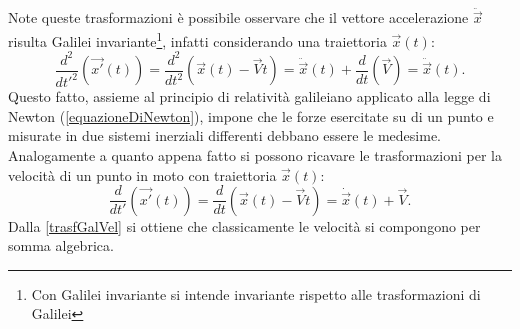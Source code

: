 Note queste trasformazioni è possibile osservare che il vettore accelerazione $\ddot{\vec{x}}$ risulta Galilei invariante\footnote{Con Galilei invariante si intende invariante rispetto alle trasformazioni di Galilei}, infatti considerando una traiettoria $\vec{x}(t)$:
\begin{equation*}
	\frac{d^2}{dt'^2}(\vec{x'}(t))=\frac{d^2}{dt^2}(\vec{x}(t)-\vec{V}t)=\ddot{\vec{x}}(t)+\frac{d}{dt}(\vec{V})=\ddot{\vec{x}}(t).
\end{equation*} 
Questo fatto, assieme al principio di relatività galileiano applicato alla legge di Newton (\ref{equazioneDiNewton}), 
impone che le forze esercitate su di un punto e misurate in due sistemi inerziali differenti debbano essere le medesime. \\
Analogamente a quanto appena fatto si possono ricavare le trasformazioni per la velocità di un punto in moto con traiettoria $\vec{x}(t)$:
\begin{equation}
	\frac{d}{dt'}(\vec{x'}(t))=\frac{d}{dt}(\vec{x}(t)-\vec{V}t)=\dot{\vec{x}}(t)+\vec{V}.\label{trasfGalVel}
\end{equation}
Dalla \eqref{trasfGalVel} si ottiene che classicamente le velocità si compongono per somma algebrica.\\

